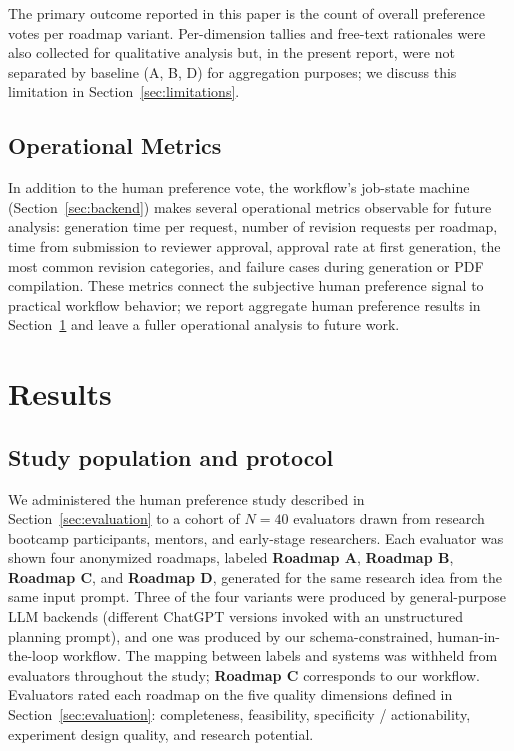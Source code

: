 \documentclass[11pt]{article}
\begin{document}
The primary outcome reported in this paper is the count of overall preference votes per roadmap variant. Per-dimension tallies and free-text rationales were also collected for qualitative analysis but, in the present report, were not separated by baseline (A, B, D) for aggregation purposes; we discuss this limitation in Section~\ref{sec:limitations}.

\subsection{Operational Metrics}
\label{sec:operational}

In addition to the human preference vote, the workflow's job-state machine (Section~\ref{sec:backend}) makes several operational metrics observable for future analysis: generation time per request, number of revision requests per roadmap, time from submission to reviewer approval, approval rate at first generation, the most common revision categories, and failure cases during generation or PDF compilation. These metrics connect the subjective human preference signal to practical workflow behavior; we report aggregate human preference results in Section~\ref{sec:results} and leave a fuller operational analysis to future work.


\section{Results}
\label{sec:results}

\subsection*{Study population and protocol}
We administered the human preference study described in Section~\ref{sec:evaluation} to a cohort of $N=40$ evaluators drawn from research bootcamp participants, mentors, and early-stage researchers. Each evaluator was shown four anonymized roadmaps, labeled \textbf{Roadmap A}, \textbf{Roadmap B}, \textbf{Roadmap C}, and \textbf{Roadmap D}, generated for the same research idea from the same input prompt. Three of the four variants were produced by general-purpose LLM backends (different ChatGPT versions invoked with an unstructured planning prompt), and one was produced by our schema-constrained, human-in-the-loop workflow. The mapping between labels and systems was withheld from evaluators throughout the study; \textbf{Roadmap C} corresponds to our workflow. Evaluators rated each roadmap on the five quality dimensions defined in Section~\ref{sec:evaluation}: completeness, feasibility, specificity / actionability, experiment design quality, and research potential.
\end{document}
